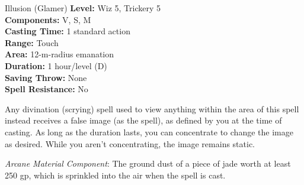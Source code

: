 {Illusion (Glamer)}
{
	\textbf{Level:}
	Wiz 5, Trickery 5\\
	\textbf{Components:}
	V, S, M\\
	\textbf{Casting Time:}
	1 standard action\\
	\textbf{Range:}
	Touch\\
	\textbf{Area:}
	12-m-radius emanation\\
	\textbf{Duration:}
	1 hour/level (D)\\
	\textbf{Saving Throw:}
	None\\
	\textbf{Spell Resistance:}
	No\\
}
{
	Any divination (scrying) spell used to view anything within the area of this spell instead receives a false image (as the  spell), as defined by you at the time of casting. As long as the duration lasts, you can concentrate to change the image as desired. While you aren't concentrating, the image remains static.

	\textit{Arcane Material Component}:
	The ground dust of a piece of jade worth at least 250 gp, which is sprinkled into the air when the spell is cast.

}
